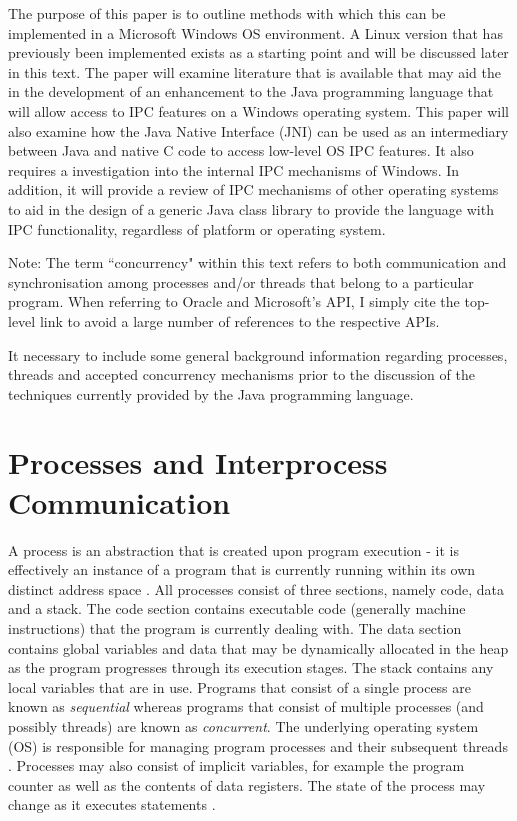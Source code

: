 \documentclass[12pt,a4paper,oneside]{article}
\begin{document}
  The purpose of this paper is to outline methods with which this can be implemented in a Microsoft Windows OS environment. A Linux version that has previously been implemented exists as a starting point and will be discussed later in this text. The paper will examine literature that is available that may aid the in the development of an enhancement to the Java programming language that will allow access to IPC features on a Windows operating system. This paper will also examine how the Java Native Interface (JNI) can be used as an intermediary between Java and native C code to access low-level OS IPC features. It also requires a investigation into the internal IPC mechanisms of Windows. In addition, it will provide a review of IPC mechanisms of other operating systems to aid in the design of a generic Java class library to provide the language with IPC functionality, regardless of platform or operating system.

  Note: The term ``concurrency" within this text refers to both communication and synchronisation among processes and/or threads that belong to a particular program.
  When referring to Oracle and Microsoft's API, I simply cite the top-level link to avoid a large number of references to the respective APIs.

  It necessary to include some general background information regarding processes, threads and accepted concurrency mechanisms prior to the discussion of the techniques currently provided by the Java programming language.

\section{Processes and Interprocess Communication}
  A process is an abstraction that is created upon program execution - it is effectively an instance of a program that is currently running within its own distinct address space \citep{modernOS}. All processes consist of three sections, namely code, data and a stack. The code section contains executable code (generally machine instructions) that the program is currently dealing with. The data section contains global variables and data that may be dynamically allocated in the heap as the program progresses through its execution stages. The stack contains any local variables that are in use. Programs that consist of a single process are known as \textit{sequential} whereas programs that consist of multiple processes (and possibly threads) are known as \textit{concurrent}. The underlying operating system (OS) is responsible for managing program processes and their subsequent threads \citep{garg2005concurrent}. Processes may also consist of implicit variables, for example the program counter as well as the contents of data registers. The state of the process may change as it executes statements \citep{trainBook}.
\end{document}

